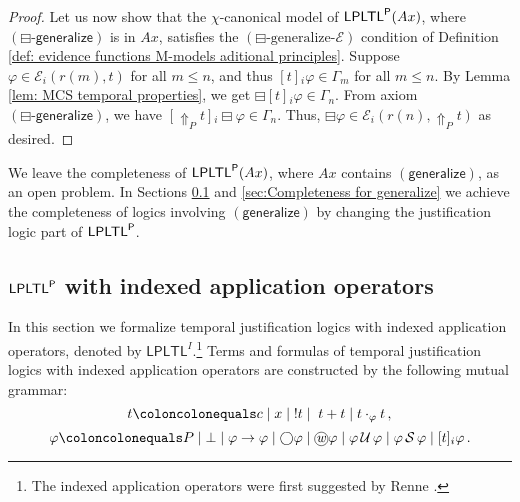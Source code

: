 \documentclass[envcountsect,envcountsame,oribibl,orivec]{llncs}
\newcommand*\circled[1]{\tikz[baseline=(char.base)]{
		\node[shape=circle,draw,inner sep=0.4pt] (char) {#1};}}
\newcommand{\lfalse}{\bot}
\newcommand{\limplies}{\rightarrow}
\newcommand{\lnext}{\bigcirc}
\newcommand{\lonce}{\diamondminus}
\newcommand{\lsofar}{\boxminus}
\newcommand{\luntil}{{\,\mathcal{U}\,}}
\newcommand{\lsince}{{\,\mathcal{S}\,}}
\newcommand{\wprevious}{\circled{\textit{w}}}
\newcommand{\LPLTLp}{\textsf{LPLTL}^{\sf P}}
\newcommand{\LPLTL}{\textsf{LPLTL}}
\newcommand{\jbox}[1]{\left[#1\right]\!}
\newcommand{\tapp}{\cdot}
\newcommand{\tinspect}{!}
\newcommand{\thenceforthgeneralize}{\Uparrow_P}
\newcommand{\agent}{i}
\newcommand{\generalizeprinciple}{\ensuremath{(\textsf{generalize})}}
\newcommand{\pastgeneralizeprinciple}{\ensuremath{(\lsofar\textsf{-generalize})}}
\newcommand{\pastgeneralizeevidence}{\ensuremath{(\lsofar\text{-generalize-}\evidence)}}
\newcommand{\evidence}{\mathcal{E}}
\renewcommand{\phi}{\varphi}
\begin{document}
\begin{proof}
Let us now show that the $\chi$-canonical model of  $\LPLTLp(Ax)$, where $\pastgeneralizeprinciple$ is in $Ax$, satisfies the $\pastgeneralizeevidence$ condition of Definition \ref{def: evidence functions M-models aditional principles}. Suppose $\phi \in \evidence_\agent(r(m), t)$ for all $m \leq n$, and thus $\jbox{t}_i \phi \in \Gamma_{m}$ for all $m \leq n$. By Lemma \ref{lem: MCS temporal properties}, we get $\lsofar \jbox{ t}_i \phi \in \Gamma_{n}$. From axiom $\pastgeneralizeprinciple$, we have $\jbox{\thenceforthgeneralize t}_i \lsofar \phi \in \Gamma_{n}$. Thus, $\lsofar \phi \in \evidence_i(r(n), \thenceforthgeneralize t)$ as desired.
\end{proof}

We leave the completeness of $\LPLTLp(Ax)$, where $Ax$ contains $\generalizeprinciple$, as an open problem. In Sections \ref{sec:LPLTLp with annotated Appl} and \ref{sec:Completeness for generalize} we achieve the completeness of  logics involving $\generalizeprinciple$ by changing the justification logic part of $\LPLTLp$.

\subsection{$\LPLTLp$ with indexed application operators}
\label{sec:LPLTLp with annotated Appl}

In this section we formalize temporal justification logics with indexed application operators, denoted by $\LPLTL^I$.\footnote{ The indexed application operators were first suggested by Renne \cite{Ren09TARK}.} Terms and formulas of temporal justification logics with indexed application operators are constructed by the following mutual grammar:  
%
\[
t \coloncolonequals c \mid x \mid \; \tinspect t \mid \;  t + t \mid t \tapp_\phi t \, ,
\]
%
\[
\phi \coloncolonequals P \mid \lfalse \mid \phi \limplies \phi \mid \lnext \phi \mid \wprevious \phi \mid \phi \luntil \phi \mid \phi \lsince \phi \mid \jbox{t}_\agent\phi \, . 
\]
\end{document}
